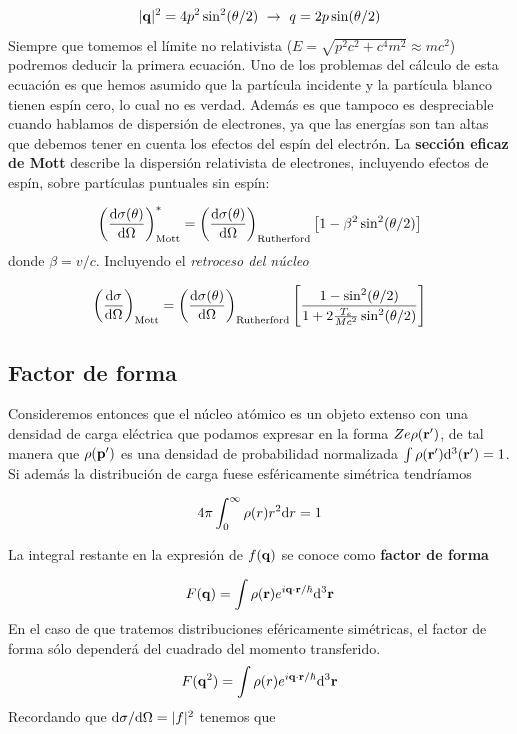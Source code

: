 \begin{eqnarray}
	|\mathbf{q}|^2 = 4 p^2 \sin^2 (\theta/2) \ \rightarrow \ q = 2p \sin (\theta/2)
\end{eqnarray}
Siempre que tomemos el límite no relativista ($E=\sqrt{p^2c^2+c^4m^2}\approx mc^2$) podremos deducir la primera ecuación. Uno de los problemas del cálculo de esta ecuación es que hemos asumido que la partícula incidente y la partícula blanco tienen espín cero, lo cual no es verdad. Además es que tampoco es despreciable cuando hablamos de dispersión de electrones, ya que las energías son tan altas que debemos tener en cuenta los efectos del espín del electrón. La \textbf{sección eficaz de Mott} describe la dispersión relativista de electrones, incluyendo efectos de espín, sobre partículas puntuales sin espín:

\begin{eqnarray}
	\left( \frac{\mathrm{d} \sigma(\theta)}{\mathrm{d} \Omega} \right)_{\text{Mott}}^* = 
	\left( \frac{\mathrm{d} \sigma(\theta)}{\mathrm{d} \Omega} \right)_{\text{Rutherford}} \left[ 1-\beta ^2 \sin^2(\theta/2) \right] 
\end{eqnarray}
donde $\beta=v/c$. Incluyendo el \textit{retroceso del núcleo}

\begin{equation}
	\left( \frac{\mathrm{d} \sigma}{\mathrm{d} \Omega} \right)_{\text{Mott}} = 
	\left( \frac{\mathrm{d} \sigma(\theta)}{\mathrm{d} \Omega} \right)_{\text{Rutherford}} \left[ \frac{1-\sin^2(\theta/2)}{1+2\frac{T_e}{Mc^2} \sin^2 (\theta/2)} \right]
\end{equation}


\subsection{Factor de forma}

Consideremos entonces que el núcleo atómico es un objeto extenso con una densidad de carga eléctrica que podamos expresar en la forma $Ze\rho (\mathbf{r}')$, de tal manera que $\rho(\mathbf{p}')$ es una densidad de probabilidad normalizada $\int \rho (\mathbf{r}') \mathrm{d}^3 (\mathbf{r}')=1$. Si además la distribución de carga fuese esféricamente simétrica tendríamos

\begin{equation}
	4 \pi \int_0^\infty \rho (r) r^2 \mathrm{d} r = 1
\end{equation}


La integral restante en la expresión de $f(\mathbf{q})$ se conoce como \textbf{factor de forma}

\begin{equation}
    F(\mathbf{q}) = \int \rho (\mathbf{r}) e^{i \mathbf{q} \cdot \mathbf{r} / \hbar} \mathrm{d}^3 \mathbf{r}
\end{equation}
En el caso de que tratemos distribuciones eféricamente simétricas, el factor de forma sólo dependerá del cuadrado del momento transferido.
\begin{equation}
    F(\mathbf{q}^2) = \int \rho (r) e^{i \mathbf{q} \cdot \mathbf{r} / \hbar} \mathrm{d}^3 \mathbf{r}
\end{equation}
Recordando que $\mathrm{d} \sigma / \mathrm{d} \Omega = |f|^2$ tenemos que

